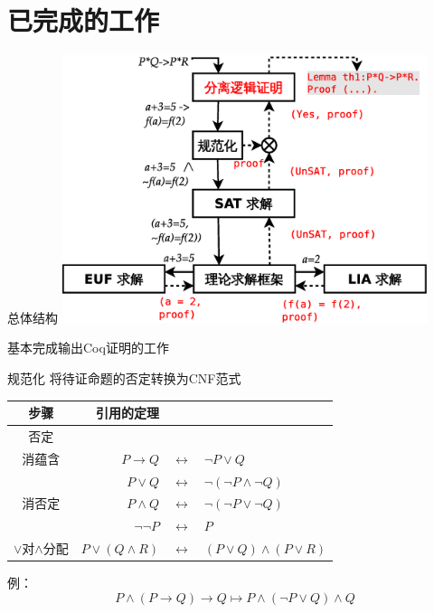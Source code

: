\documentclass{beamer}
\begin{document}
\section{已完成的工作}
\begin{frame}[fragile]
  \begin{block}{总体结构}
    \includegraphics[width=0.8\textwidth]{stru.eps}
  \end{block}
  \begin{block}{}
    基本完成输出Coq证明的工作
  \end{block}
\end{frame}

\begin{frame}[fragile]
  \begin{block}{规范化}
    将待证命题的否定转换为CNF范式
  \end{block}
  \begin{block}{}
    \begin{tabular}{c|rcl}
      步骤 & 引用的定理 & & \\
      \hline
      否定 & & &\\
      \hline
      消蕴含 & $P \rightarrow Q$ & $\leftrightarrow$ & $\lnot P \lor Q$  \\
      \hline
       & $P \lor Q$ & $\leftrightarrow$ & $\lnot ( \lnot P \land \lnot Q )$ \\
      消否定 & $ P \land Q$ & $\leftrightarrow$ & $\lnot ( \lnot P \lor \lnot Q )$ \\
      & $ \lnot \lnot P$ & $\leftrightarrow$ & $P$ \\
      \hline
      $\lor$对$\land$分配 & $ P \lor (Q \land R)$ & $\leftrightarrow$ & $(P \lor Q) \land (P \lor R)$ \\
    \end{tabular}
  \end{block}
  \begin{block}{}
    例：
    $$ P \land ( P \rightarrow Q ) \rightarrow Q \longmapsto P \land (\lnot P \lor Q) \land Q $$
  \end{block}
\end{frame}
\end{document}
